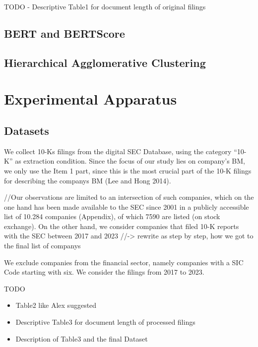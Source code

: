 \documentclass[
]{article}
\begin{document}
TODO - Descriptive Table1 for document length of original filings

\subsection{BERT and BERTScore}\label{bert-and-bertscore}

\subsection{Hierarchical Agglomerative
Clustering}\label{hierarchical-agglomerative-clustering}

\section{Experimental Apparatus}\label{experimental-apparatus}

\subsection{Datasets}\label{datasets}

We collect 10-Ks filings from the digital SEC Database, using the
category ``10-K'' as extraction condition. Since the focus of our study
lies on company's BM, we only use the Item 1 part, since this is the
most crucial part of the 10-K filings for describing the companys BM
(Lee and Hong 2014).

//Our observations are limited to an intersection of such companies,
which on the one hand has been made available to the SEC since 2001 in a
publicly accessible list of 10.284 companies (Appendix), of which 7590
are listed (on stock exchange). On the other hand, we consider companies
that filed 10-K reports with the SEC between 2017 and 2023
//-\textgreater{} rewrite as step by step, how we got to the final list
of companys

We exclude companies from the financial sector, namely companies with a
SIC Code starting with six. We consider the filings from 2017 to 2023.

TODO

\begin{itemize}
\item
  Table2 like Alex suggested
\item
  Descriptive Table3 for document length of processed filings
\item
  Description of Table3 and the final Dataset
\end{itemize}
\end{document}
